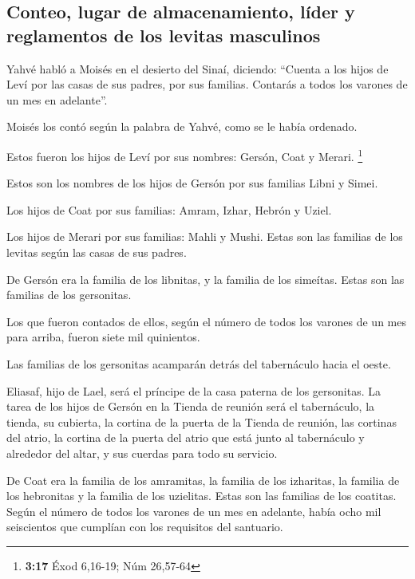 \hypertarget{conteo-lugar-de-almacenamiento-luxedder-y-reglamentos-de-los-levitas-masculinos}{%
\subsection{Conteo, lugar de almacenamiento, líder y reglamentos de los
levitas
masculinos}\label{conteo-lugar-de-almacenamiento-luxedder-y-reglamentos-de-los-levitas-masculinos}}

 Yahvé habló a Moisés en el desierto del Sinaí, diciendo:
 ``Cuenta a los hijos de Leví por las casas de sus
padres, por sus familias. Contarás a todos los varones de un mes en
adelante''.

 Moisés los contó según la palabra de Yahvé, como se le
había ordenado.

 Estos fueron los hijos de Leví por sus nombres: Gersón,
Coat y Merari. \footnote{\textbf{3:17} Éxod 6,16-19; Núm 26,57-64}

 Estos son los nombres de los hijos de Gersón por sus
familias Libni y Simei.

 Los hijos de Coat por sus familias: Amram, Izhar, Hebrón
y Uziel.

 Los hijos de Merari por sus familias: Mahli y Mushi.
Estas son las familias de los levitas según las casas de sus padres.

 De Gersón era la familia de los libnitas, y la familia
de los simeítas. Estas son las familias de los gersonitas.

 Los que fueron contados de ellos, según el número de
todos los varones de un mes para arriba, fueron siete mil quinientos.

 Las familias de los gersonitas acamparán detrás del
tabernáculo hacia el oeste.

 Eliasaf, hijo de Lael, será el príncipe de la casa
paterna de los gersonitas.  La tarea de los hijos de
Gersón en la Tienda de reunión será el tabernáculo, la tienda, su
cubierta, la cortina de la puerta de la Tienda de reunión,
 las cortinas del atrio, la cortina de la puerta del
atrio que está junto al tabernáculo y alrededor del altar, y sus cuerdas
para todo su servicio.

 De Coat era la familia de los amramitas, la familia de
los izharitas, la familia de los hebronitas y la familia de los
uzielitas. Estas son las familias de los coatitas.  Según
el número de todos los varones de un mes en adelante, había ocho mil
seiscientos que cumplían con los requisitos del santuario.

